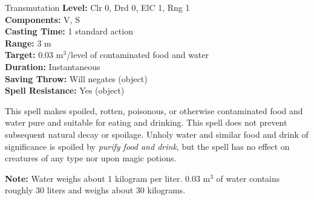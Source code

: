 {Transmutation}
{
	\textbf{Level:}
	Clr 0, Drd 0, ElC 1, Rng 1\\
	\textbf{Components:}
	V, S\\
	\textbf{Casting Time:}
	1 standard action\\
	\textbf{Range:}
	3 m\\
	\textbf{Target:}
	0.03 m$^3$/level of contaminated food and water\\
	\textbf{Duration:}
	Instantaneous\\
	\textbf{Saving Throw:}
	Will negates (object)\\
	\textbf{Spell Resistance:}
	Yes (object)\\
}
{
	This spell makes spoiled, rotten, poisonous, or otherwise contaminated food and water pure and suitable for eating and drinking. This spell does not prevent subsequent natural decay or spoilage. Unholy water and similar food and drink of significance is spoiled by \emph{purify food and drink}, but the spell has no effect on creatures of any type nor upon magic potions.

	\textbf{Note:} Water weighs about 1 kilogram per liter. 0.03 m$^3$ of water contains roughly 30 liters and weighs about 30 kilograms.

}
